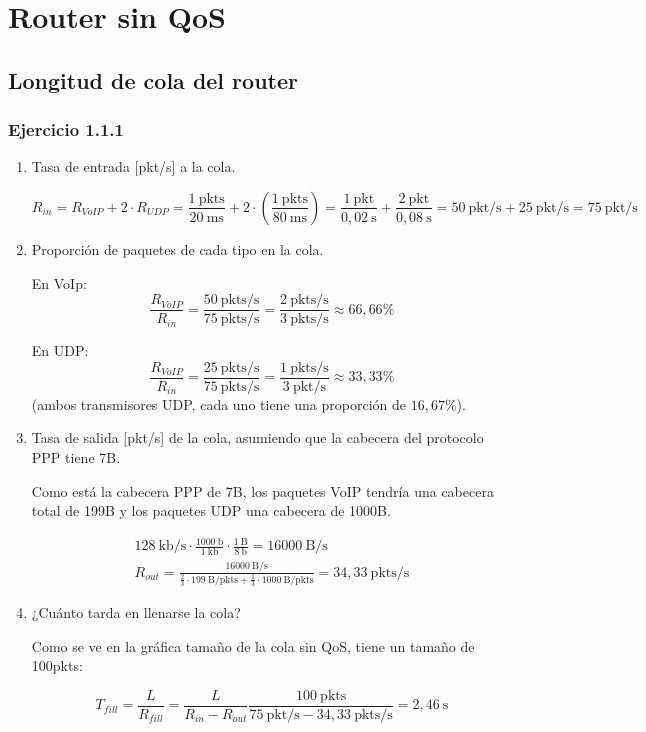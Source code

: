 \chapter{Router sin QoS}
\label{chap:sinqos}

\section{Longitud de cola del router}

\subsection{Ejercicio 1.1.1}

\renewcommand{\theenumi}{\alph{enumi}}
\begin{enumerate}
    \item Tasa de entrada [pkt/s] a la cola.

\[
\label{eq:sinqos_tasa_entrada}
R_{in} = R_{VoIP} + 2 \cdot R_{UDP} = \frac{1~\mathrm{pkts}}{20~\text{ms}} + 2 \cdot \left(\frac{1 ~ \text{pkts} }{80 ~ \text{ms} }\right) = \frac{1~\mathrm{pkt}}{0,02~\text{s}} + \frac{2~\mathrm{pkt}}{0,08~\text{s}} = 50 ~ \text{pkt/s} + 25 ~ \text{pkt/s} = 75 ~ \text{pkt/s}
\]

    \item Proporción de paquetes de cada tipo en la cola.

    En VoIp: \[ \frac{R_{VoIP}}{R_{in}} = \frac{50~\text{pkts/s}}{75~\text{pkts/s}} = \frac{2~\text{pkts/s}}{3~\text{pkts/s}}  \approx 66,66\%\]

    En UDP: \[ \frac{R_{VoIP}}{R_{in}} = \frac{25~\text{pkts/s}}{75~\text{pkts/s}} = \frac{1~\text{pkts/s}}{3~\text{pkt/s}} \approx 33,33\% \] 
            (ambos transmisores UDP, cada uno tiene una proporción de \( 16,67\% \)).

    \item Tasa de salida [pkt/s] de la cola, asumiendo que la cabecera del protocolo PPP tiene 7B.
 
    Como está la cabecera PPP de 7B, los paquetes VoIP tendría una cabecera total de 199B y los paquetes UDP una cabecera de 1000B.

    \begin{eqnarray}
        \label{eq:senqos_tasa_salida}
        128~\text{kb/s} \cdot \frac{1000~\text{b}}{1~\text{kb}} \cdot \frac{1~\text{B}}{8~\text{b}} = 16000~\text{B/s} \\
        R_{out} = \frac{16000~\text{B/s}}{ \frac{2}{3} \cdot  199~\text{B/pkts} + \frac{1}{3} \cdot 1000~\text{B/pkts}} = 34,33~\text{pkts/s}
    \end{eqnarray}


    \item ¿Cuánto tarda en llenarse la cola?
    
    Como se ve en la gráfica tamaño de la cola sin QoS, tiene un tamaño de 100pkts:

    \[
    \label{eq:sinqos_tiempo_llenado}
      T_{fill} = \frac{L}{R_{fill}} = \frac{L}{R_{in} - R_{out}} \frac{100~\text{pkts}}{75~\text{pkt/s} - 34,33~\text{pkts/s}} = 2,46~\text{s}
    \]


\end{enumerate}

